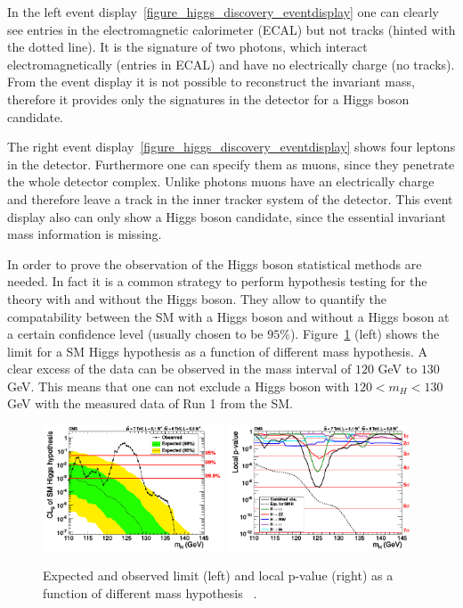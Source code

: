 In the left event display~\ref{figure_higgs_discovery_eventdisplay} one can clearly see entries in the electromagnetic calorimeter (ECAL) but not tracks (hinted with the dotted line).
It is the signature of two photons, which interact electromagnetically (entries in ECAL) and have no electrically charge (no tracks). From the event display it is not
possible to reconstruct the invariant mass, therefore it provides only the signatures in the detector for a Higgs boson candidate.

The right event display~\ref{figure_higgs_discovery_eventdisplay} shows four leptons in the detector. Furthermore one can specify them as muons, since they
penetrate the whole detector complex. Unlike photons muons have an electrically charge and therefore leave a track in the inner tracker system of the detector.
This event display also can only show a Higgs boson candidate, since the essential invariant mass information is missing.

In order to prove the observation of the Higgs boson statistical methods are needed. In fact it is a common strategy to perform
hypothesis testing for the theory with and without the Higgs boson. They allow to quantify the compatability between the SM with a Higgs boson and
without a Higgs boson at a certain confidence level (usually chosen to be $95\%$). Figure~\ref{figure_higgs_discovery_limit} (left) shows the limit for a SM Higgs hypothesis as a function
of different mass hypothesis. A clear excess of the data can be observed in the mass interval of $120$ GeV to $130$ GeV. This means that one can not exclude a Higgs boson with $120 < m_H <130$ GeV
with the measured data of Run 1 from the SM.

\begin{figure}[h]
\includegraphics[width=0.48\textwidth]{../plots/higgs_combined_cls.pdf}
\hfill
\includegraphics[width=0.48\textwidth]{../plots/higgs_p_value.pdf}
\caption[Higgs boson discovery CMS limit.]{Expected and observed limit (left) and local p-value (right) as a function of different mass hypothesis ~\cite{HiggsDiscovery_CMS}.}
\label{figure_higgs_discovery_limit}
\end{figure}

